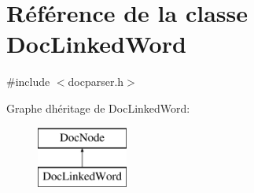 \hypertarget{class_doc_linked_word}{}\section{Référence de la classe Doc\+Linked\+Word}
\label{class_doc_linked_word}


{\ttfamily \#include $<$docparser.\+h$>$}

Graphe d\textquotesingle{}héritage de Doc\+Linked\+Word\+:\begin{figure}[H]
\begin{center}
\leavevmode
\includegraphics[height=2.000000cm]{class_doc_linked_word}
\end{center}
\end{figure}
